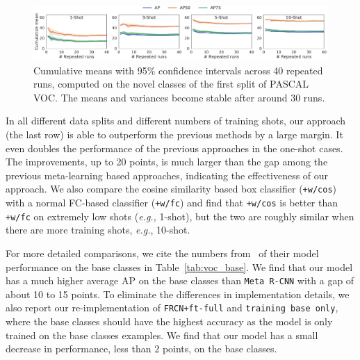 \begin{figure}[ht]
	\begin{center}
		\centerline{\includegraphics[width=\columnwidth*2]{figs/avgap_std.pdf}}
		\vspace{-5mm}
		\caption{Cumulative means with 95\% confidence intervals across 40 repeated runs, computed on the novel classes of the first split of PASCAL VOC. The means and variances become stable after around 30 runs.}
		\label{fig:avg-ap}
	\end{center}
	\vspace{-10mm}
\end{figure}

In all different data splits and different numbers of training shots, our approach (the last row) is able to outperform the
previous methods by a large margin. It even doubles the performance of the previous approaches in the one-shot cases. The 
improvements, up to 20 points, is much larger than the gap among the previous meta-learning based approaches, indicating the effectiveness of our approach.  We also
compare the cosine similarity based box classifier (\texttt{\model+w/cos}) with a normal FC-based classifier (\texttt{\model+w/fc}) and find that \texttt{\model+w/cos} is better than \texttt{\model+w/fc} on extremely low shots (\textit{e.g.,} 1-shot), but the two are roughly similar when there are more training shots, \textit{e.g.}, 10-shot. 

For more detailed comparisons, we cite the numbers from~\citet{yan2019meta} of their model performance on the base classes in Table~\ref{tab:voc_base}. We find that our model has a much higher average AP on the base classes than \texttt{Meta R-CNN} with a gap of about 10 to 15 points. To eliminate the differences in implementation details, we also report our re-implementation of \texttt{FRCN+ft-full} and \texttt{training base only}, where the base classes should have the highest accuracy as the model is only trained on the base classes examples. We find that our model has a small decrease in performance, less than 2 points, on the base classes.


